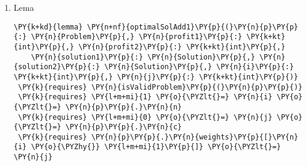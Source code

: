 \begin{sloppypar}
\begin{enumerate}
     \begin{Verbatim}[commandchars=\\\{\}]
\PY{k}{requires} \PY{n}{isOptimalPartialSolution}\PY{p}{(}\PY{n}{p}\PY{p}{,} \PY{n}{solution}\PY{p}{,} \PY{n}{i}\PY{p}{,} \PY{n}{j}\PY{p}{)}
\end{Verbatim}
     trebuie să demonstrăm că dacă din acestă soluție vom extrage ultimul obiect adăugat atunci vom obține o soluție optimă pentru o subproblemă cu un obiect mai puțin și capacitatea rămasă a rucsacului după eliminarea greutății corespunzătoare obiectului:
     \begin{Verbatim}[commandchars=\\\{\}]
\PY{k}{ensures} \PY{n}{isOptimalPartialSolution}\PY{p}{(}\PY{n}{p}\PY{p}{,} \PY{n}{solution}\PY{p}{[}\PY{p}{..}\PY{n}{i} \PY{o}{\PYZhy{}} \PY{l+m+mi}{1}\PY{p}{]}\PY{p}{,} 
        \PY{n}{i} \PY{o}{\PYZhy{}} \PY{l+m+mi}{1}\PY{p}{,} \PY{n}{j} \PY{o}{\PYZhy{}} \PY{n}{p}\PY{p}{.}\PY{n}{weights}\PY{p}{[}\PY{n}{i} \PY{o}{\PYZhy{}} \PY{l+m+mi}{1}\PY{p}{]}\PY{p}{)}
\end{Verbatim}
    \hspace{2mm} Pentru a putea demonstra această lemă, am început prin a presupune că soluția rămasă după eliminarea obiectului nu este optimă pentru subproblema ($i - 1, j - p.weights[i - 1]$), dar că există o presupusă soluție $x$ ce aduce un profit optim pentru aceasta   . Dar dacă pentru această soluție am adăuga obiectul $i$, am obține o soluție de lungime $i$ cu un profit mai bun decât $solution$, ceea ce contrazice precondiția lemei, deci este presupunerea făcută la început este falsă.
     \item Lema 
     \begin{Verbatim}[commandchars=\\\{\}]
\PY{k+kd}{lemma} \PY{n+nf}{optimalSolAdd1}\PY{p}{(}\PY{n}{p}\PY{p}{:} \PY{n}{Problem}\PY{p}{,} \PY{n}{profit1}\PY{p}{:} \PY{k+kt}{int}\PY{p}{,} \PY{n}{profit2}\PY{p}{:} \PY{k+kt}{int}\PY{p}{,} 
    \PY{n}{solution1}\PY{p}{:} \PY{n}{Solution}\PY{p}{,} \PY{n}{solution2}\PY{p}{:} \PY{n}{Solution}\PY{p}{,} \PY{n}{i}\PY{p}{:} \PY{k+kt}{int}\PY{p}{,} \PY{n}{j}\PY{p}{:} \PY{k+kt}{int}\PY{p}{)}
 \PY{k}{requires} \PY{n}{isValidProblem}\PY{p}{(}\PY{n}{p}\PY{p}{)}
 \PY{k}{requires} \PY{l+m+mi}{1} \PY{o}{\PYZlt{}=} \PY{n}{i} \PY{o}{\PYZlt{}=} \PY{n}{p}\PY{p}{.}\PY{n}{n}
 \PY{k}{requires} \PY{l+m+mi}{0} \PY{o}{\PYZlt{}=} \PY{n}{j} \PY{o}{\PYZlt{}=} \PY{n}{p}\PY{p}{.}\PY{n}{c}
 \PY{k}{requires} \PY{n}{p}\PY{p}{.}\PY{n}{weights}\PY{p}{[}\PY{n}{i} \PY{o}{\PYZhy{}} \PY{l+m+mi}{1}\PY{p}{]} \PY{o}{\PYZlt{}=} \PY{n}{j}

\end{Verbatim}
\end{enumerate}
\end{sloppypar}
